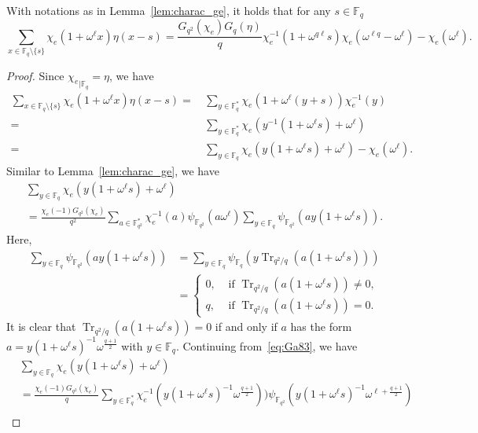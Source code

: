 \documentclass[ALCO,ThmDefs,Unicode]{cedram}
\DeclareMathOperator{\Tr}{Tr}
\newcommand*\F{{\mathbb F}}
\begin{document}
\begin{lemm}\label{lem:charac28}
With notations as in Lemma~\ref{lem:charac_ge}, it holds that for any $s\in \F_q$
\[
\sum_{x\in \F_q\setminus \{s\}}\chi_{e}(1+\omega^\ell x)\eta(x-s)=\frac{G_{q^2}(\chi_e)G_q(\eta)}{q}\chi_e^{-1}(1+\omega^{q\ell}s)
\chi_e(\omega^{\ell q}-\omega^\ell)-\chi_e(\omega^\ell).
\]
\end{lemm}

\begin{proof}
Since ${\chi_e}_{|\F_q}=\eta$, we have
\begin{align}
\sum_{x\in \F_q\setminus \{s\}}\chi_e(1+\omega^\ell x)\eta(x-s)=&\, \sum_{y\in \F_q^\ast}\chi_e(1+\omega^\ell (y+s))\chi_e^{-1}(y)\nonumber\\
=&\, \sum_{y\in \F_q^\ast}\chi_e(y^{-1}(1+\omega^\ell s)+\omega^\ell)\nonumber\\
=&\, \sum_{y\in \F_q}\chi_{e}(y(1+\omega^\ell s)+\omega^\ell)-\chi_e(\omega^\ell). \label{eq:chara28}
\end{align}
Similar to Lemma~\ref{lem:charac_ge}, we have
\begin{multline}\label{eq:Ga83}
\sum_{y\in \F_q}\chi_e(y(1+\omega^\ell s)+\omega^\ell)\\=
\frac{\chi_e(-1)G_{q^2}(\chi_e)}{q^2}\sum_{a\in \F_{q^2}^\ast}\chi_e^{-1}(a)\psi_{\F_{q^2}}(a\omega^\ell)\sum_{y\in \F_q}\psi_{\F_{q^2}}(a y(1+\omega^\ell s)).
\end{multline}
Here,
\begin{align*}
\sum_{y\in \F_q}\psi_{\F_{q^2}}(a y(1+\omega^\ell s))&=
\sum_{y\in \F_q}\psi_{\F_q}(y\Tr_{q^2/q}(a (1+\omega^\ell s)))\\
&=
\begin{cases}
0,& \text{ if } \Tr_{q^2/q}(a (1+\omega^\ell s))\not=0,\\
q,& \text{ if } \Tr_{q^2/q}(a (1+\omega^\ell s))=0.
\end{cases}
\end{align*}
It is clear that $\Tr_{q^2/q}(a (1+\omega^\ell s))=0$ if and only if $a$ has the form $a=y (1+\omega^\ell s)^{-1}\omega^\frac{q+1}{2}$ with $y\in \F_q$. Continuing from~\eqref{eq:Ga83}, we have
\begin{align}
&\sum_{y\in \F_q}\chi_e(y(1+\omega^\ell s)+\omega^\ell)\nonumber\\
&=\frac{\chi_e(-1)G_{q^2}(\chi_e)}{q}\sum_{y\in \F_q^\ast}\chi_e^{-1}(y (1+\omega^\ell s)^{-1}\omega^\frac{q+1}{2}))\psi_{\F_{q^2}}(y (1+\omega^\ell s)^{-1}\omega^{\ell+\frac{q+1}{2}})\nonumber\\

\end{align}
\end{proof}
\end{document}

